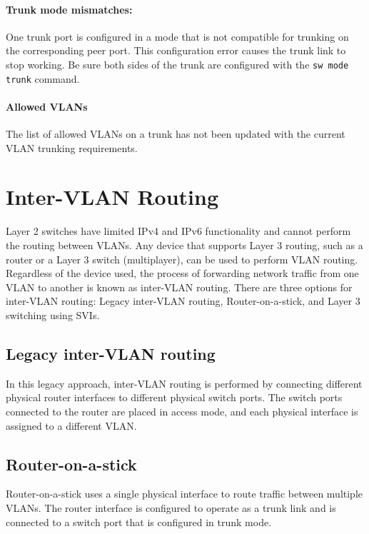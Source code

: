 \paragraph{Trunk mode mismatches:} One trunk port is configured in a mode that is not compatible for trunking on the corresponding peer port. This configuration error causes the trunk link to stop working. Be sure both sides of the trunk are configured with the \verb|sw mode trunk| command. 

\paragraph{Allowed VLANs} The list of allowed VLANs on a trunk has not been updated with the current VLAN trunking requirements. 

\section{Inter-VLAN Routing}

Layer 2 switches have limited IPv4 and IPv6 functionality and cannot perform the routing between VLANs. Any device that supports Layer 3 routing, such as a router or a Layer 3 switch (multiplayer), can be used to perform VLAN routing. Regardless of the device used, the process of forwarding network traffic from one VLAN to another is known as inter-VLAN routing. There are three options for inter-VLAN routing: Legacy inter-VLAN routing, Router-on-a-stick, and Layer 3 switching using SVIs.

\subsection{Legacy inter-VLAN routing}

In this legacy approach, inter-VLAN routing is performed by connecting different physical router interfaces to different physical switch ports. The switch ports connected to the router are placed in access mode, and each physical interface is assigned to a different VLAN.

\subsection{Router-on-a-stick}

Router-on-a-stick uses a single physical interface to route traffic between multiple VLANs. The router interface is configured to operate as a trunk link and is connected to a switch port that is configured in trunk mode. \\

